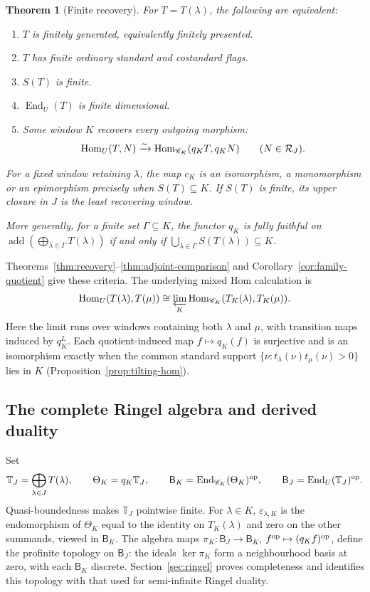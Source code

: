 \documentclass[11pt,reqno]{amsart}
\newcommand{\Hom}{\operatorname{Hom}}\newcommand{\End}{\operatorname{End}}\newcommand{\Ext}{\operatorname{Ext}}
\newcommand{\add}{\operatorname{add}}\newcommand{\im}{\operatorname{im}}\newcommand{\coker}{\operatorname{coker}}\newcommand{\rad}{\operatorname{rad}}
\newcommand{\BJ}{\mathsf B_J}\newcommand{\BK}{\mathsf B_K}\newcommand{\TJ}{\mathbb T_J}\newcommand{\GK}{\mathsf G_K}\newcommand{\GJ}{\mathsf G_J}
\newtheorem{theorem}{Theorem}[section]
\theoremstyle{definition}
\theoremstyle{remark}
\numberwithin{equation}{section}
\begin{document}
\begin{theorem}[Finite recovery]\label{thm:intro-recovery}
For $T=T(\lambda)$, the following are equivalent:
\begin{enumerate}
\item $T$ is finitely generated, equivalently finitely presented.
\item $T$ has finite ordinary standard and costandard flags.
\item $S(T)$ is finite.
\item $\End_U(T)$ is finite dimensional.
\item Some window $K$ recovers every outgoing morphism:
\[
 \Hom_U(T,N)\xrightarrow{\sim}
       \Hom_{\CC_K}(q_KT,q_KN)\qquad(N\in\RR_J).
\]
\end{enumerate}
For a fixed window retaining $\lambda$, the map $c_K$ is an
isomorphism, a monomorphism or an epimorphism precisely when
$S(T)\subseteq K$. If $S(T)$ is finite, its upper closure in $J$
is the least recovering window.

More generally, for a finite set $\Gamma\subseteq K$, the functor $q_K$ is
fully faithful on $\add(\bigoplus_{\lambda\in\Gamma}T(\lambda))$
if and only if $\bigcup_{\lambda\in\Gamma}S(T(\lambda))\subseteq K$.
\end{theorem}

Theorems~\ref{thm:recovery}--\ref{thm:adjoint-comparison} and
Corollary~\ref{cor:family-quotient} give these criteria. The underlying
mixed Hom calculation is
\[
 \Hom_U(T(\lambda),T(\mu))
 \cong\varprojlim_K\Hom_{\CC_K}(T_K(\lambda),T_K(\mu)).
\]
Here the limit runs over windows containing both $\lambda$ and $\mu$,
with transition maps induced by $q_K^L$.
Each quotient-induced map $f\mapsto q_K(f)$ is surjective and is
an isomorphism exactly when
the common standard support
$\{\nu:t_\lambda(\nu)t_\mu(\nu)>0\}$ lies in $K$
(Proposition~\ref{prop:tilting-hom}).

\subsection{The complete Ringel algebra and derived duality}
Set
\[
 \TJ=\bigoplus_{\lambda\in J}T(\lambda),\qquad
 \Theta_K=q_K\TJ,\qquad
 \BK=\End_{\CC_K}(\Theta_K)^{\op},\qquad
 \BJ=\End_U(\TJ)^{\op}.
\]
Quasi-boundedness makes $\TJ$ pointwise finite.
For $\lambda\in K$, $\varepsilon_{\lambda,K}$ is the endomorphism
of $\Theta_K$ equal to the identity on $T_K(\lambda)$ and zero on
the other summands, viewed in $\BK$. The algebra maps
$\pi_K:\BJ\to\BK$, $f^{\mathrm{op}}\mapsto(q_Kf)^{\mathrm{op}}$, define the
profinite topology on $\BJ$: the ideals $\ker\pi_K$ form a
neighbourhood basis at zero, with each $\BK$ discrete.
Section~\ref{sec:ringel} proves completeness and identifies this
topology with that used for semi-infinite Ringel duality.
\end{document}
